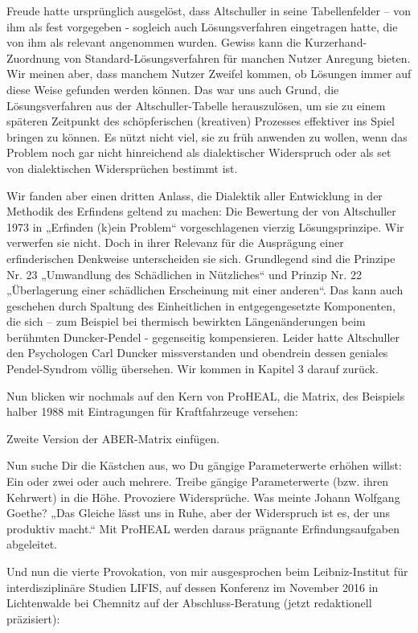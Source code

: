 \documentclass[12pt,a4paper]{article}
\begin{document}
Freude hatte ursprünglich ausgelöst, dass Altschuller in seine Tabellenfelder –
von ihm als fest vorgegeben - sogleich auch Lösungsverfahren eingetragen hatte,
die von ihm als relevant angenommen wurden. Gewiss kann die
Kurzerhand-Zuordnung von Standard-Lösungsverfahren für manchen Nutzer Anregung
bieten. Wir meinen aber, dass manchem Nutzer Zweifel kommen, ob Lösungen immer
auf diese Weise gefunden werden können. Das war uns auch Grund, die
Lösungsverfahren aus der Altschuller-Tabelle herauszulösen, um sie zu einem
späteren Zeitpunkt des schöpferischen (kreativen) Prozesses effektiver ins
Spiel bringen zu können. Es nützt nicht viel, sie zu früh anwenden zu wollen,
wenn das Problem noch gar nicht hinreichend als dialektischer Widerspruch oder
als set von dialektischen Widersprüchen bestimmt ist.

Wir fanden aber einen dritten Anlass, die Dialektik aller Entwicklung in der
Methodik des Erfindens geltend zu machen: Die Bewertung der von Altschuller
1973 in „Erfinden (k)ein Problem“ vorgeschlagenen vierzig Lösungsprinzipe. Wir
verwerfen sie nicht. Doch in ihrer Relevanz für die Ausprägung einer
erfinderischen Denkweise unterscheiden sie sich. Grundlegend sind die Prinzipe
Nr. 23 „Umwandlung des Schädlichen in Nützliches“ und Prinzip Nr. 22
„Überlagerung einer schädlichen Erscheinung mit einer anderen“. Das kann auch
geschehen durch Spaltung des Einheitlichen in entgegengesetzte Komponenten, die
sich – zum Beispiel bei thermisch bewirkten Längenänderungen beim berühmten
Duncker-Pendel - gegenseitig kompensieren. Leider hatte Altschuller den
Psychologen Carl Duncker missverstanden und obendrein dessen geniales
Pendel-Syndrom völlig übersehen. Wir kommen in Kapitel 3 darauf zurück.

Nun blicken wir nochmals auf den Kern von ProHEAL, die Matrix, des Beispiels
halber 1988 mit Eintragungen für Kraftfahrzeuge versehen:
\begin{center}
  Zweite Version der ABER-Matrix einfügen.
\end{center}
Nun suche Dir die Kästchen aus, wo Du gängige Parameterwerte erhöhen willst:
Ein oder zwei oder auch mehrere. Treibe gängige Parameterwerte (bzw. ihren
Kehrwert) in die Höhe. Provoziere Widersprüche. Was meinte Johann Wolfgang
Goethe? „Das Gleiche lässt uns in Ruhe, aber der Widerspruch ist es, der uns
produktiv macht.“ Mit ProHEAL werden daraus prägnante Erfindungsaufgaben
abgeleitet.

Und nun die vierte Provokation, von mir ausgesprochen beim Leibniz-Institut für
interdisziplinäre Studien LIFIS, auf dessen Konferenz im November 2016 in
Lichtenwalde bei Chemnitz auf der Abschluss-Beratung (jetzt redaktionell
präzisiert):
\end{document}
